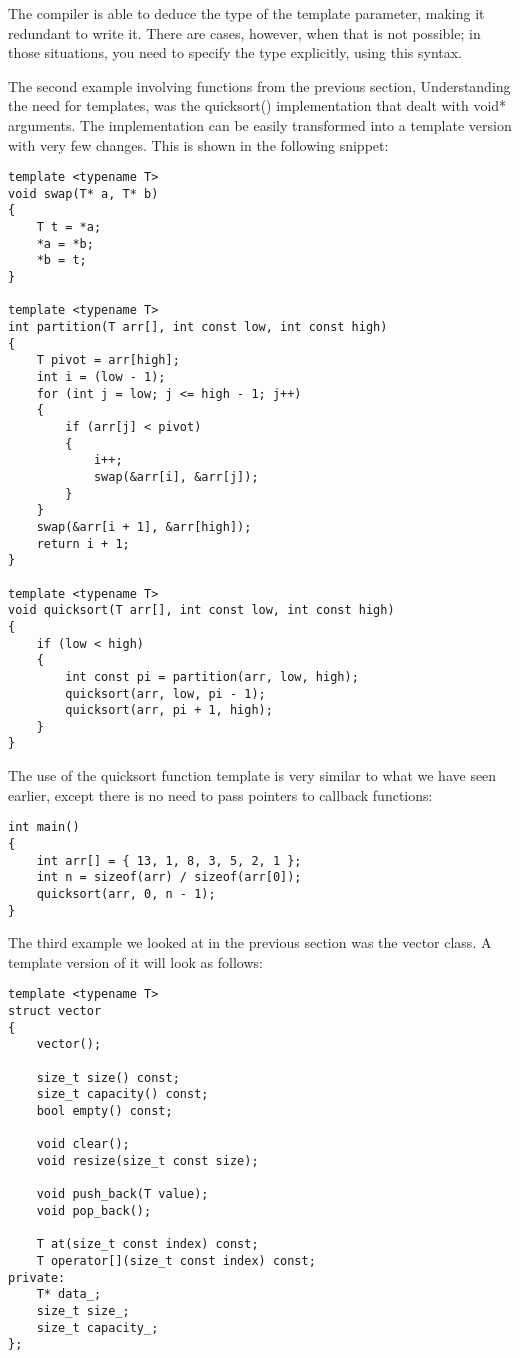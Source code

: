 The compiler is able to deduce the type of the template parameter, making it redundant to write it. There are cases, however, when that is not possible; in those situations, you need to specify the type explicitly, using this syntax.

The second example involving functions from the previous section, Understanding the need for templates, was the quicksort() implementation that dealt with void* arguments. The implementation can be easily transformed into a template version with very few changes. This is shown in the following snippet:

\begin{lstlisting}[style=styleCXX]
template <typename T>
void swap(T* a, T* b)
{
	T t = *a;
	*a = *b;
	*b = t;
}

template <typename T>
int partition(T arr[], int const low, int const high)
{
	T pivot = arr[high];
	int i = (low - 1);
	for (int j = low; j <= high - 1; j++)
	{
		if (arr[j] < pivot)
		{
			i++;
			swap(&arr[i], &arr[j]);
		}
	}
	swap(&arr[i + 1], &arr[high]);
	return i + 1;
}

template <typename T>
void quicksort(T arr[], int const low, int const high)
{
	if (low < high)
	{
		int const pi = partition(arr, low, high);
		quicksort(arr, low, pi - 1);
		quicksort(arr, pi + 1, high);
	}
}
\end{lstlisting}

The use of the quicksort function template is very similar to what we have seen earlier, except there is no need to pass pointers to callback functions:

\begin{lstlisting}[style=styleCXX]
int main()
{
	int arr[] = { 13, 1, 8, 3, 5, 2, 1 };
	int n = sizeof(arr) / sizeof(arr[0]);
	quicksort(arr, 0, n - 1);
}
\end{lstlisting}

The third example we looked at in the previous section was the vector class. A template version of it will look as follows:

\begin{lstlisting}[style=styleCXX]
template <typename T>
struct vector
{
	vector();
	
	size_t size() const;
	size_t capacity() const;
	bool empty() const;
	
	void clear();
	void resize(size_t const size);
	
	void push_back(T value);
	void pop_back();
	
	T at(size_t const index) const;
	T operator[](size_t const index) const;
private:
	T* data_;
	size_t size_;
	size_t capacity_;
};
\end{lstlisting}

